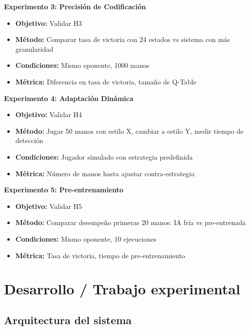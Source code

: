 \documentclass[12pt,a4paper]{article}
\begin{document}
\textbf{Experimento 3: Precisión de Codificación}
\begin{itemize}
    \item \textbf{Objetivo:} Validar H3
    \item \textbf{Método:} Comparar tasa de victoria con 24 estados vs sistema con más granularidad
    \item \textbf{Condiciones:} Mismo oponente, 1000 manos
    \item \textbf{Métrica:} Diferencia en tasa de victoria, tamaño de Q-Table
\end{itemize}

\textbf{Experimento 4: Adaptación Dinámica}
\begin{itemize}
    \item \textbf{Objetivo:} Validar H4
    \item \textbf{Método:} Jugar 50 manos con estilo X, cambiar a estilo Y, medir tiempo de detección
    \item \textbf{Condiciones:} Jugador simulado con estrategia predefinida
    \item \textbf{Métrica:} Número de manos hasta ajustar contra-estrategia
\end{itemize}

\textbf{Experimento 5: Pre-entrenamiento}
\begin{itemize}
    \item \textbf{Objetivo:} Validar H5
    \item \textbf{Método:} Comparar desempeño primeras 20 manos: IA fría vs pre-entrenada
    \item \textbf{Condiciones:} Mismo oponente, 10 ejecuciones
    \item \textbf{Métrica:} Tasa de victoria, tiempo de pre-entrenamiento
\end{itemize}

\newpage

\section{Desarrollo / Trabajo experimental}

\subsection{Arquitectura del sistema}
\end{document}
